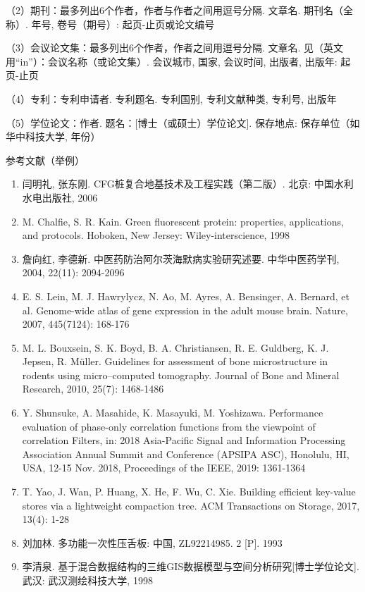 （2）期刊：最多列出6个作者，作者与作者之间用逗号分隔. 文章名. 期刊名（全称）. 年号, 卷号（期号）: 起页-止页或论文编号

（3）会议论文集：最多列出6个作者，作者之间用逗号分隔. 文章名. 见（英文用“in”）：会议名称（或论文集）. 会议城市, 国家, 会议时间, 出版者, 出版年: 起页-止页

（4）专利：专利申请者. 专利题名. 专利国别, 专利文献种类, 专利号, 出版年

（5）学位论文：作者. 题名：[博士（或硕士）学位论文]. 保存地点: 保存单位（如华中科技大学, 年份）

参考文献（举例）
\begin{enumerate}
\renewcommand{\labelenumi}{[\theenumi]}
\item	闫明礼, 张东刚. CFG桩复合地基技术及工程实践（第二版）. 北京: 中国水利水电出版社, 2006

\item	M. Chalfie, S. R. Kain. Green fluorescent protein: properties, applications, and protocols. Hoboken, New Jersey: Wiley-interscience, 1998

\item	詹向红, 李德新. 中医药防治阿尔茨海默病实验研究述要. 中华中医药学刊, 2004, 22(11): 2094-2096

\item	E. S. Lein, M. J. Hawrylycz, N. Ao, M. Ayres, A. Bensinger, A. Bernard, et al. Genome-wide atlas of gene expression in the adult mouse brain. Nature, 2007, 445(7124): 168-176

\item	M. L. Bouxsein, S. K. Boyd, B. A. Christiansen, R. E. Guldberg, K. J. Jepsen, R. Müller. Guidelines for assessment of bone microstructure in rodents using micro–computed tomography. Journal of Bone and Mineral Research, 2010, 25(7): 1468-1486

\item	Y. Shunsuke, A. Masahide, K. Masayuki, M. Yoshizawa. Performance evaluation of phase-only correlation functions from the viewpoint of correlation Filters, in: 2018 Asia-Pacific Signal and Information Processing Association Annual Summit and Conference (APSIPA ASC), Honolulu, HI, USA, 12-15 Nov. 2018, Proceedings of the IEEE, 2019: 1361-1364

\item	T. Yao, J. Wan, P. Huang, X. He, F. Wu, C. Xie. Building efficient key-value stores via a lightweight compaction tree. ACM Transactions on Storage, 2017, 13(4): 1-28

\item	刘加林. 多功能一次性压舌板: 中国, ZL92214985. 2 [P]. 1993

\item	李清泉. 基于混合数据结构的三维GIS数据模型与空间分析研究[博士学位论文]. 武汉: 武汉测绘科技大学, 1998

\end{enumerate}

